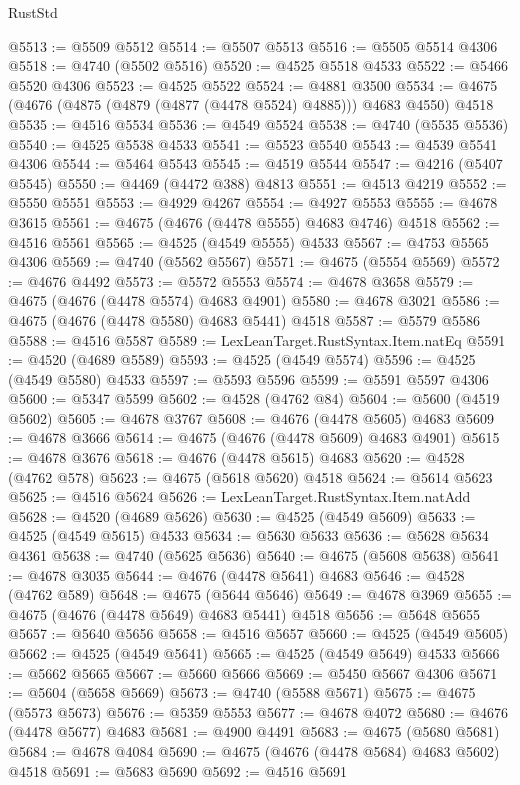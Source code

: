 \begin{lexlean}{RustStd}
\begin{coremodule}
@5513 := @5509 @5512
@5514 := @5507 @5513
@5516 := @5505 @5514 @4306
@5518 := @4740 (@5502 @5516)
@5520 := @4525 @5518 @4533
@5522 := @5466 @5520 @4306
@5523 := @4525 @5522
@5524 := @4881 @3500
@5534 := @4675 (@4676 (@4875 (@4879 (@4877 (@4478 @5524) @4885))) @4683 @4550) @4518
@5535 := @4516 @5534
@5536 := @4549 @5524
@5538 := @4740 (@5535 @5536)
@5540 := @4525 @5538 @4533
@5541 := @5523 @5540
@5543 := @4539 @5541 @4306
@5544 := @5464 @5543
@5545 := @4519 @5544
@5547 := @4216 (@5407 @5545)
@5550 := @4469 (@4472 @388) @4813
@5551 := @4513 @4219
@5552 := @5550 @5551
@5553 := @4929 @4267
@5554 := @4927 @5553
@5555 := @4678 @3615
@5561 := @4675 (@4676 (@4478 @5555) @4683 @4746) @4518
@5562 := @4516 @5561
@5565 := @4525 (@4549 @5555) @4533
@5567 := @4753 @5565 @4306
@5569 := @4740 (@5562 @5567)
@5571 := @4675 (@5554 @5569)
@5572 := @4676 @4492
@5573 := @5572 @5553
@5574 := @4678 @3658
@5579 := @4675 (@4676 (@4478 @5574) @4683 @4901)
@5580 := @4678 @3021
@5586 := @4675 (@4676 (@4478 @5580) @4683 @5441) @4518
@5587 := @5579 @5586
@5588 := @4516 @5587
@5589 := LexLeanTarget.RustSyntax.Item.natEq
@5591 := @4520 (@4689 @5589)
@5593 := @4525 (@4549 @5574)
@5596 := @4525 (@4549 @5580) @4533
@5597 := @5593 @5596
@5599 := @5591 @5597 @4306
@5600 := @5347 @5599
@5602 := @4528 (@4762 @84)
@5604 := @5600 (@4519 @5602)
@5605 := @4678 @3767
@5608 := @4676 (@4478 @5605) @4683
@5609 := @4678 @3666
@5614 := @4675 (@4676 (@4478 @5609) @4683 @4901)
@5615 := @4678 @3676
@5618 := @4676 (@4478 @5615) @4683
@5620 := @4528 (@4762 @578)
@5623 := @4675 (@5618 @5620) @4518
@5624 := @5614 @5623
@5625 := @4516 @5624
@5626 := LexLeanTarget.RustSyntax.Item.natAdd
@5628 := @4520 (@4689 @5626)
@5630 := @4525 (@4549 @5609)
@5633 := @4525 (@4549 @5615) @4533
@5634 := @5630 @5633
@5636 := @5628 @5634 @4361
@5638 := @4740 (@5625 @5636)
@5640 := @4675 (@5608 @5638)
@5641 := @4678 @3035
@5644 := @4676 (@4478 @5641) @4683
@5646 := @4528 (@4762 @589)
@5648 := @4675 (@5644 @5646)
@5649 := @4678 @3969
@5655 := @4675 (@4676 (@4478 @5649) @4683 @5441) @4518
@5656 := @5648 @5655
@5657 := @5640 @5656
@5658 := @4516 @5657
@5660 := @4525 (@4549 @5605)
@5662 := @4525 (@4549 @5641)
@5665 := @4525 (@4549 @5649) @4533
@5666 := @5662 @5665
@5667 := @5660 @5666
@5669 := @5450 @5667 @4306
@5671 := @5604 (@5658 @5669)
@5673 := @4740 (@5588 @5671)
@5675 := @4675 (@5573 @5673)
@5676 := @5359 @5553
@5677 := @4678 @4072
@5680 := @4676 (@4478 @5677) @4683
@5681 := @4900 @4491
@5683 := @4675 (@5680 @5681)
@5684 := @4678 @4084
@5690 := @4675 (@4676 (@4478 @5684) @4683 @5602) @4518
@5691 := @5683 @5690
@5692 := @4516 @5691

\end{coremodule}
\end{lexlean}
